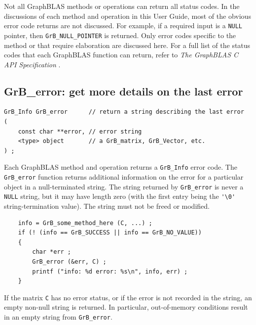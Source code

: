 Not all GraphBLAS methods or operations can return all status codes.
In the discussions of each method and operation in this User Guide, most of the
obvious error code returns are not discussed.  For example, if a required input
is a \verb'NULL' pointer, then \verb'GrB_NULL_POINTER' is returned.  Only error
codes specific to the method or that require elaboration are discussed here.
For a full list of the status codes that each GraphBLAS function can return,
refer to {\em The GraphBLAS C API Specification} \cite{spec,spec2}.

\subsection{{\sf GrB\_error:} get more details on the last error} %
\label{error}

\begin{mdframed}[userdefinedwidth=6in]
{\footnotesize
\begin{verbatim}
GrB_Info GrB_error      // return a string describing the last error
(
    const char **error, // error string
    <type> object       // a GrB_matrix, GrB_Vector, etc.
) ;
\end{verbatim}
}\end{mdframed}

Each GraphBLAS method and operation returns a \verb'GrB_Info' error code.  The
\verb'GrB_error' function returns additional information on the error for a
particular object in a null-terminated string.  The string returned by
\verb'GrB_error' is never a \verb'NULL' string, but it may have length zero
(with the first entry being the \verb"'\0'" string-termination value).  The
string must not be freed or modified.

    {\footnotesize
    \begin{verbatim}
    info = GrB_some_method_here (C, ...) ;
    if (! (info == GrB_SUCCESS || info == GrB_NO_VALUE))
    {
        char *err ;
        GrB_error (&err, C) ;
        printf ("info: %d error: %s\n", info, err) ;
    } \end{verbatim}}

If the matrix \verb'C' has no error status, or if the error is not recorded in
the string, an empty non-null string is returned.  In particular, out-of-memory
conditions result in an empty string from \verb'GrB_error'.

